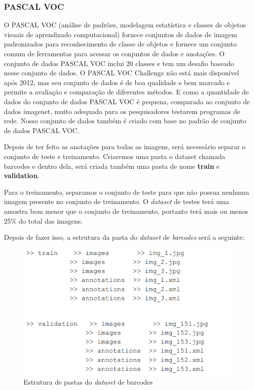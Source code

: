 \subsubsection*{PASCAL VOC}
O PASCAL VOC (análise de padrões, modelagem estatística e classes de objetos visuais de aprendizado computacional) \cite{everingham2010pascal} fornece conjuntos de dados de imagem padronizados para reconhecimento de classe de objetos e fornece um conjunto comum de ferramentas para acessar os conjuntos de dados e anotações. O conjunto de dados PASCAL VOC inclui 20 classes e tem um desafio baseado nesse conjunto de dados. O PASCAL VOC Challenge \cite{everingham2010pascal} não está mais disponível após 2012, mas seu conjunto de dados é de boa qualidade e bem marcado e permite a avaliação e comparação de diferentes métodos. E como a quantidade de dados do conjunto de dados PASCAL VOC é pequena, comparada ao conjunto de dados imagenet, muito adequada para os pesquisadores testarem programas de rede. Nosso conjunto de dados também é criado com base no padrão de conjunto de dados PASCAL VOC.\cite{zhou2017application}

Depois de ter feito as anotações para todas as imagens, será necessário separar o conjunto de teste e treinamento. Criaremos uma pasta o dataset chamada barcodes e dentro dela, será criada também uma pasta de nome \textbf{train} e \textbf{validation}.

Para o treinamento, separamos o conjunto de teste para que não possua nenhuma imagem presente no conjunto de treinamento. O \textit{dataset} de testes terá uma amostra bem menor que o conjunto de treinamento, portanto terá mais ou menos 25\% do total das imagens.

Depois de fazer isso, a estrutura da pasta do  \textit{dataset} de  \textit{barcodes} será a seguinte:

\begin{figure}[htbp]
	\centering
	\includegraphics[width=0.5\linewidth]{figuras/MachineLearning/foldersDataset.png}
	\caption{Estrutura de pastas do \textit{dataset} de barcodes}
	\label{fig:labelimg}
\end{figure}

